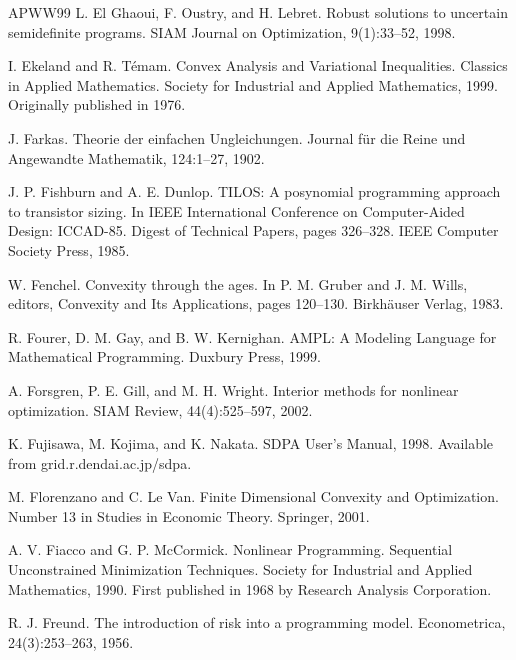 \begin{thebibliography}{APWW99}
 L. El Ghaoui, F. Oustry, and H. Lebret. Robust solutions to uncertain semidefinite programs. SIAM Journal on Optimization, 9(1):33–52, 1998.

 I. Ekeland and R. Témam. Convex Analysis and Variational Inequalities. Classics in Applied Mathematics. Society for Industrial and Applied Mathematics, 1999. Originally published in 1976.

 J. Farkas. Theorie der einfachen Ungleichungen. Journal für die Reine und Angewandte Mathematik, 124:1–27, 1902.

 J. P. Fishburn and A. E. Dunlop. TILOS: A posynomial programming approach to transistor sizing. In IEEE International Conference on Computer-Aided Design: ICCAD-85. Digest of Technical Papers, pages 326–328. IEEE Computer Society Press, 1985.

 W. Fenchel. Convexity through the ages. In P. M. Gruber and J. M. Wills, editors, Convexity and Its Applications, pages 120–130. Birkhäuser Verlag, 1983.

 R. Fourer, D. M. Gay, and B. W. Kernighan. AMPL: A Modeling Language for Mathematical Programming. Duxbury Press, 1999.

 A. Forsgren, P. E. Gill, and M. H. Wright. Interior methods for nonlinear optimization. SIAM Review, 44(4):525–597, 2002.

 K. Fujisawa, M. Kojima, and K. Nakata. SDPA User’s Manual, 1998. Available from grid.r.dendai.ac.jp/sdpa.

 M. Florenzano and C. Le Van. Finite Dimensional Convexity and Optimization. Number 13 in Studies in Economic Theory. Springer, 2001.

 A. V. Fiacco and G. P. McCormick. Nonlinear Programming. Sequential Unconstrained Minimization Techniques. Society for Industrial and Applied Mathematics, 1990. First published in 1968 by Research Analysis Corporation.

 R. J. Freund. The introduction of risk into a programming model. Econometrica, 24(3):253–263, 1956.


\end{thebibliography}
